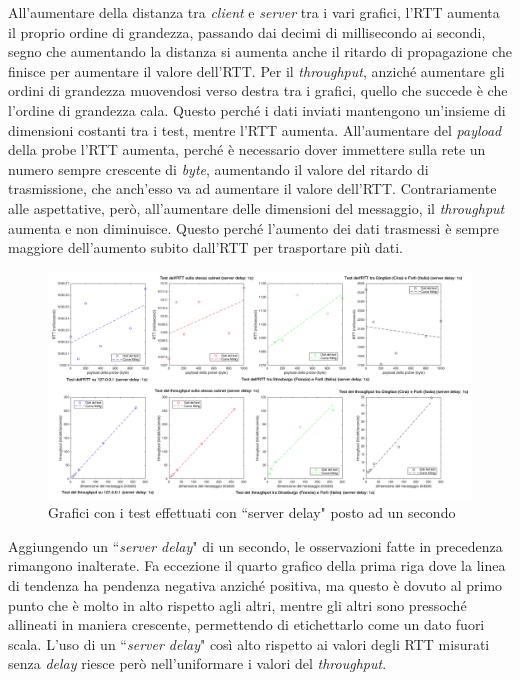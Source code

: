\documentclass[a4paper, 12pt]{report}
\begin{document}
All'aumentare della distanza tra \textit{client} e \textit{server} tra i vari grafici, l'RTT aumenta il proprio ordine di grandezza, passando
dai decimi di millisecondo ai secondi, segno che aumentando la distanza si aumenta anche il ritardo di propagazione che finisce per aumentare il
valore dell'RTT.\newline
Per il \textit{throughput}, anziché aumentare gli ordini di grandezza muovendosi verso destra tra i grafici, quello che succede è che l'ordine
di grandezza cala. Questo perché i dati inviati mantengono un'insieme di dimensioni costanti tra i test, mentre l'RTT aumenta.\newline
All'aumentare del \textit{payload} della probe l'RTT aumenta, perché è necessario dover immettere sulla rete un numero sempre 
crescente di \textit{byte}, aumentando il valore del ritardo di trasmissione, che anch'esso va ad aumentare il valore dell'RTT.\newline
Contrariamente alle aspettative, però, all'aumentare delle dimensioni del messaggio, il \textit{throughput} aumenta e non diminuisce. Questo perché
l'aumento dei dati trasmessi è sempre maggiore dell'aumento subito dall'RTT per trasportare più dati.

\begin{figure}[H]
	\centering
	\includegraphics[width=\linewidth]{images/delay.png}
	\caption{Grafici con i test effettuati con ``server delay" posto ad un secondo}
\end{figure}

Aggiungendo un ``\textit{server delay}" di un secondo, le osservazioni fatte in precedenza rimangono inalterate. Fa eccezione il quarto grafico della
prima riga dove la linea di tendenza ha pendenza negativa anziché positiva, ma questo è dovuto al primo punto che è molto in alto rispetto
agli altri, mentre gli altri sono pressoché allineati in maniera crescente, permettendo di etichettarlo come un dato fuori scala.\newline
L'uso di un ``\textit{server delay}" così alto rispetto ai valori degli RTT misurati senza \textit{delay} riesce però nell'uniformare i valori
del \textit{throughput}.
\end{document}
